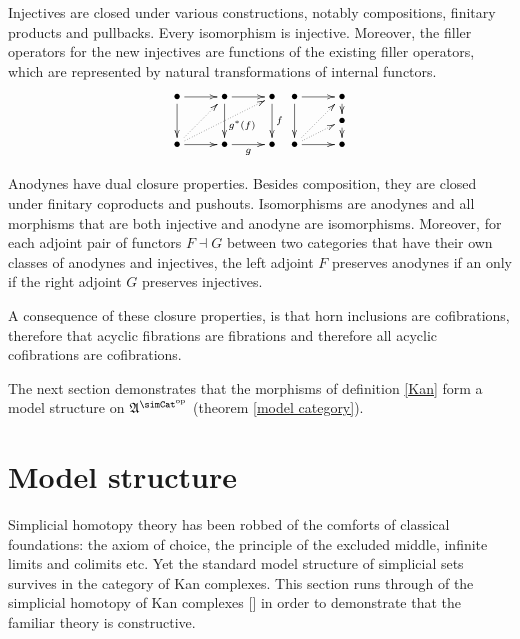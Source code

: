 \documentclass{tac}
\newcommand\ri{^*}
\newcommand\dual{^{\mathrm{op}}}
\newcommand\s{^{\simCat\dual}}
\newcommand\citep[1]{[\cite{#1}]}
\newcommand\ambient{\mathfrak A}
\begin{document}
\begin{remark}[Saturation] Injectives are closed under various constructions, notably compositions, finitary products and pullbacks. Every isomorphism is injective. Moreover, the filler operators for the new injectives are functions of the existing filler operators, which are represented by natural transformations of internal functors.
\[
\xy
(0,12)*+{\bullet}="a",(12,12)*+{\bullet}="b",(24,12)*+{\bullet}="c",
(0,0)*+{\bullet}="d",(12,0)*+{\bullet}="e",(24,0)*+{\bullet}="f",
\ar "a";"b" \ar "b";"c" \ar "a";"d" \ar^(.6){g\ri(f)} "b";"e" \ar^f "c";"f" \ar "d";"e" \ar_g "e";"f"
\ar@{.>} "d";"c" \ar@{.>} "d";"b"
\endxy
\xy
(0,12)*+{\bullet}="a",(12,12)*+{\bullet}="b",(12,6)*+{\bullet}="c",(0,0)*+{\bullet}="d",(12,0)*+{\bullet}="e"
\ar "a";"b" \ar "a";"d" \ar "b";"c" \ar "c";"e" \ar "d";"e" \ar@{.>} "d";"b" \ar@{.>} "d";"c"
\endxy
\]

Anodynes have dual closure properties. Besides composition, they are closed under finitary coproducts and pushouts. Isomorphisms are anodynes and all morphisms that are both injective and anodyne are isomorphisms. Moreover, for each adjoint pair of functors $F\dashv G$ between two categories that have their own classes of anodynes and injectives, the left adjoint $F$ preserves anodynes if an only if the right adjoint $G$ preserves injectives.

A consequence of these closure properties, is that horn inclusions are cofibrations, therefore that acyclic fibrations are fibrations and therefore all acyclic cofibrations are cofibrations.
\end{remark}

The next section demonstrates that the morphisms of definition \ref{Kan} form a model structure on $\ambient\s$ (theorem \ref{model category}).

\section{Model structure}%
Simplicial homotopy theory has been robbed of the comforts of classical foundations: the axiom of choice, the principle of the excluded middle, infinite limits and colimits etc. Yet the standard model structure of simplicial sets survives in the category of Kan complexes. This section runs through of the simplicial homotopy of Kan complexes \citep{Hovey99,GJSHT} in order to demonstrate that the familiar theory is constructive.
\end{document}
